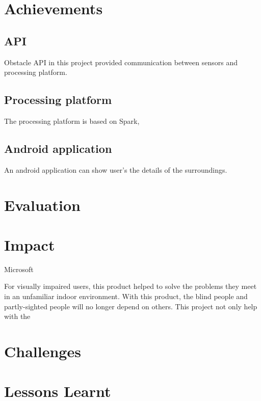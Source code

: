 \documentclass[prodmode,acmtosem]{acmsmall} %
\begin{document}
\section{Achievements}
\subsection{API}
Obstacle API in this project provided communication between sensors and processing platform. 
\subsection{Processing platform}
The processing platform is based on Spark, 
\subsection{Android application}
An android application can show user's the details of the surroundings.
\section{Evaluation}
\section{Impact}
Microsoft

For visually impaired users, this product helped to solve the problems they meet in an unfamiliar indoor environment. With this product, the blind people and partly-sighted people will no longer depend on others. This project not only help with the
\section{Challenges}
\section{Lessons Learnt}
\end{document}
